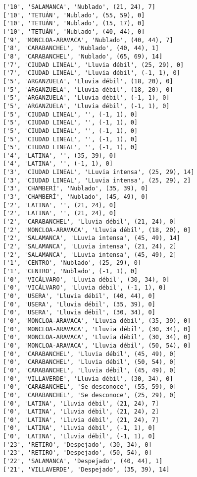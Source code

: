 \documentclass[11pt]{article}
\begin{document}
\begin{Verbatim}[commandchars=\\\{\}]
['10', 'SALAMANCA', 'Nublado', (21, 24), 7]
['10', 'TETUÁN', 'Nublado', (55, 59), 0]
['10', 'TETUÁN', 'Nublado', (15, 17), 0]
['10', 'TETUÁN', 'Nublado', (40, 44), 0]
['9', 'MONCLOA-ARAVACA', 'Nublado', (40, 44), 7]
['8', 'CARABANCHEL', 'Nublado', (40, 44), 1]
['8', 'CARABANCHEL', 'Nublado', (65, 69), 14]
['7', 'CIUDAD LINEAL', 'Lluvia débil', (25, 29), 0]
['7', 'CIUDAD LINEAL', 'Lluvia débil', (-1, 1), 0]
['5', 'ARGANZUELA', 'Lluvia débil', (18, 20), 0]
['5', 'ARGANZUELA', 'Lluvia débil', (18, 20), 0]
['5', 'ARGANZUELA', 'Lluvia débil', (-1, 1), 0]
['5', 'ARGANZUELA', 'Lluvia débil', (-1, 1), 0]
['5', 'CIUDAD LINEAL', '', (-1, 1), 0]
['5', 'CIUDAD LINEAL', '', (-1, 1), 0]
['5', 'CIUDAD LINEAL', '', (-1, 1), 0]
['5', 'CIUDAD LINEAL', '', (-1, 1), 0]
['5', 'CIUDAD LINEAL', '', (-1, 1), 0]
['4', 'LATINA', '', (35, 39), 0]
['4', 'LATINA', '', (-1, 1), 0]
['3', 'CIUDAD LINEAL', 'LLuvia intensa', (25, 29), 14]
['3', 'CIUDAD LINEAL', 'LLuvia intensa', (25, 29), 2]
['3', 'CHAMBERÍ', 'Nublado', (35, 39), 0]
['3', 'CHAMBERÍ', 'Nublado', (45, 49), 0]
['2', 'LATINA', '', (21, 24), 0]
['2', 'LATINA', '', (21, 24), 0]
['2', 'CARABANCHEL', 'Lluvia débil', (21, 24), 0]
['2', 'MONCLOA-ARAVACA', 'Lluvia débil', (18, 20), 0]
['2', 'SALAMANCA', 'LLuvia intensa', (45, 49), 14]
['2', 'SALAMANCA', 'LLuvia intensa', (21, 24), 2]
['2', 'SALAMANCA', 'LLuvia intensa', (45, 49), 2]
['1', 'CENTRO', 'Nublado', (25, 29), 0]
['1', 'CENTRO', 'Nublado', (-1, 1), 0]
['0', 'VICÁLVARO', 'Lluvia débil', (30, 34), 0]
['0', 'VICÁLVARO', 'Lluvia débil', (-1, 1), 0]
['0', 'USERA', 'Lluvia débil', (40, 44), 0]
['0', 'USERA', 'Lluvia débil', (35, 39), 0]
['0', 'USERA', 'Lluvia débil', (30, 34), 0]
['0', 'MONCLOA-ARAVACA', 'Lluvia débil', (35, 39), 0]
['0', 'MONCLOA-ARAVACA', 'Lluvia débil', (30, 34), 0]
['0', 'MONCLOA-ARAVACA', 'Lluvia débil', (30, 34), 0]
['0', 'MONCLOA-ARAVACA', 'Lluvia débil', (50, 54), 0]
['0', 'CARABANCHEL', 'Lluvia débil', (45, 49), 0]
['0', 'CARABANCHEL', 'Lluvia débil', (50, 54), 0]
['0', 'CARABANCHEL', 'Lluvia débil', (45, 49), 0]
['0', 'VILLAVERDE', 'Lluvia débil', (30, 34), 0]
['0', 'CARABANCHEL', 'Se desconoce', (55, 59), 0]
['0', 'CARABANCHEL', 'Se desconoce', (25, 29), 0]
['0', 'LATINA', 'Lluvia débil', (21, 24), 7]
['0', 'LATINA', 'Lluvia débil', (21, 24), 2]
['0', 'LATINA', 'Lluvia débil', (21, 24), 7]
['0', 'LATINA', 'Lluvia débil', (-1, 1), 0]
['0', 'LATINA', 'Lluvia débil', (-1, 1), 0]
['23', 'RETIRO', 'Despejado', (30, 34), 0]
['23', 'RETIRO', 'Despejado', (50, 54), 0]
['22', 'SALAMANCA', 'Despejado', (40, 44), 1]
['21', 'VILLAVERDE', 'Despejado', (35, 39), 14]

\end{Verbatim}
\end{document}

